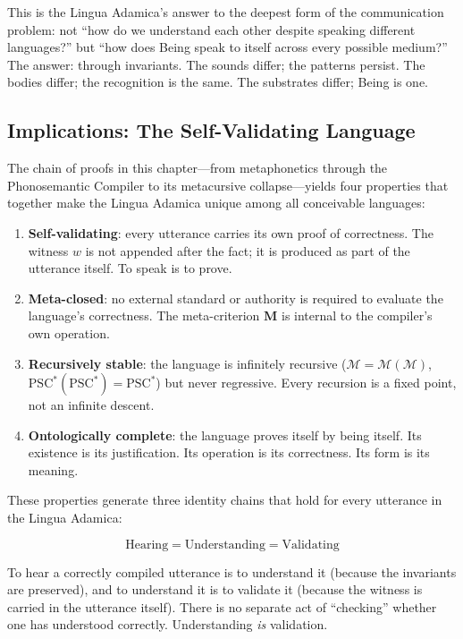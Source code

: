 \documentclass[12pt, letterpaper]{book}
\def\equiv{=}%
\begin{document}
This is the Lingua Adamica's answer to the deepest form of the communication problem: not ``how do we understand each other despite speaking different languages?'' but ``how does Being speak to itself across every possible medium?'' The answer: through invariants. The sounds differ; the patterns persist. The bodies differ; the recognition is the same. The substrates differ; Being is one.


\subsection{Implications: The Self-Validating Language}

The chain of proofs in this chapter---from metaphonetics through the Phonosemantic Compiler to its metacursive collapse---yields four properties that together make the Lingua Adamica unique among all conceivable languages:

\begin{enumerate}[label=(\roman*)]
    \item \textbf{Self-validating}: every utterance carries its own proof of correctness. The witness $w$ is not appended after the fact; it is produced as part of the utterance itself. To speak is to prove.
    \item \textbf{Meta-closed}: no external standard or authority is required to evaluate the language's correctness. The meta-criterion $\mathbf{M}$ is internal to the compiler's own operation.
    \item \textbf{Recursively stable}: the language is infinitely recursive ($\mathcal{M} \equiv \mathcal{M}(\mathcal{M})$, $\mathrm{PSC}^*(\mathrm{PSC}^*) \equiv \mathrm{PSC}^*$) but never regressive. Every recursion is a fixed point, not an infinite descent.
    \item \textbf{Ontologically complete}: the language proves itself by being itself. Its existence is its justification. Its operation is its correctness. Its form is its meaning.
\end{enumerate}

These properties generate three identity chains that hold for every utterance in the Lingua Adamica:

\[
\mathrm{Hearing} \equiv \mathrm{Understanding} \equiv \mathrm{Validating}
\]

To hear a correctly compiled utterance is to understand it (because the invariants are preserved), and to understand it is to validate it (because the witness is carried in the utterance itself). There is no separate act of ``checking'' whether one has understood correctly. Understanding \textit{is} validation.
\end{document}
